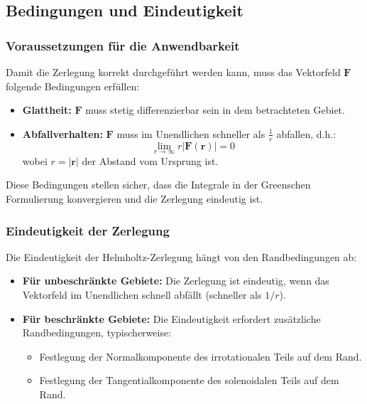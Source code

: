 \subsection{Bedingungen und Eindeutigkeit
\label{helmholtz:subsection:Bedingungen_Eindeutigkeit}}

\subsubsection{Voraussetzungen für die Anwendbarkeit}
Damit die Zerlegung korrekt durchgeführt werden kann, muss das Vektorfeld $\mathbf{F}$ folgende Bedingungen erfüllen:

\begin{itemize}
\item \textbf{Glattheit:} $\mathbf{F}$ muss stetig differenzierbar sein in dem betrachteten Gebiet.
\item \textbf{Abfallverhalten:} $\mathbf{F}$ muss im Unendlichen schneller als $\frac{1}{r}$ abfallen, d.h.:
\begin{equation}
\lim_{r \to \infty} r|\mathbf{F}(\mathbf{r})| = 0
\end{equation}
wobei $r = |\mathbf{r}|$ der Abstand vom Ursprung ist.
\end{itemize}

\noindent Diese Bedingungen stellen sicher, dass die Integrale in der Greenschen Formulierung konvergieren und die Zerlegung eindeutig ist.

\subsubsection{Eindeutigkeit der Zerlegung}

Die Eindeutigkeit der Helmholtz-Zerlegung hängt von den Randbedingungen ab:

\begin{itemize}
\item \textbf{Für unbeschränkte Gebiete:} Die Zerlegung ist eindeutig, wenn das Vektorfeld im Unendlichen schnell abfällt (schneller als $1/r$).

\item \textbf{Für beschränkte Gebiete:} Die Eindeutigkeit erfordert zusätzliche Randbedingungen, typischerweise:
  \begin{itemize}
    \item Festlegung der Normalkomponente des irrotationalen Teils auf dem Rand.
    \item Festlegung der Tangentialkomponente des solenoidalen Teils auf dem Rand.
  \end{itemize}
\end{itemize}

